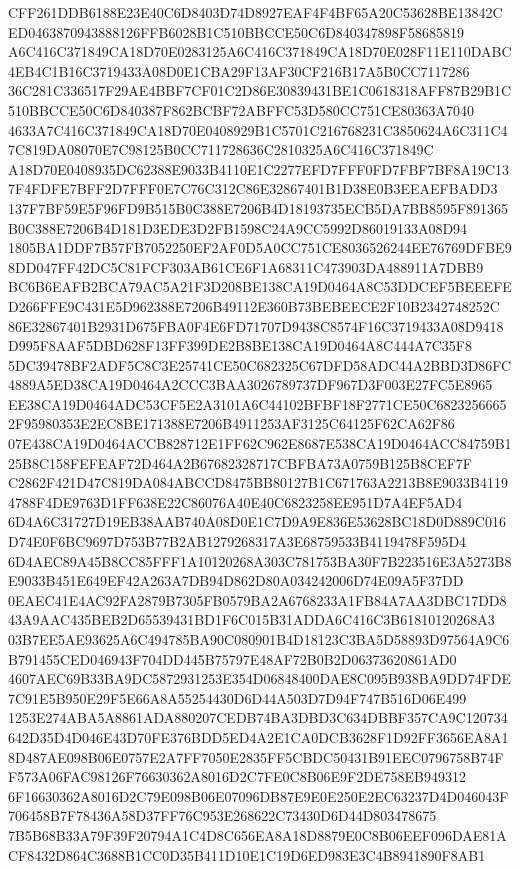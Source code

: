 \documentclass[UTF8,fontset=fandol,zihao=-4,a4paper]{ctexart}
\begin{document}
{{CFF261DDB6188E23E40C6D8403D74D8927EAF4F4BF65A20C53628BE13842CED0463870943888126FFB6028B1C510BBCCE50C6D840347898F58685819
A6C416C371849CA18D70E0283125A6C416C371849CA18D70E028F11E110DABC4EB4C1B16C3719433A08D0E1CBA29F13AF30CF216B17A5B0CC7117286
36C281C336517F29AE4BBF7CF01C2D86E30839431BE1C0618318AFF87B29B1C510BBCCE50C6D840387F862BCBF72ABFFC53D580CC751CE80363A7040
4633A7C416C371849CA18D70E0408929B1C5701C216768231C3850624A6C311C47C819DA08070E7C98125B0CC711728636C2810325A6C416C371849C
A18D70E0408935DC62388E9033B4110E1C2277EFD7FFF0FD7FBF7BF8A19C137F4FDFE7BFF2D7FFF0E7C76C312C86E32867401B1D38E0B3EEAEFBADD3
137F7BF59E5F96FD9B515B0C388E7206B4D18193735ECB5DA7BB8595F891365B0C388E7206B4D181D3EDE3D2FB1598C24A9CC5992D86019133A08D94
1805BA1DDF7B57FB7052250EF2AF0D5A0CC751CE8036526244EE76769DFBE98DD047FF42DC5C81FCF303AB61CE6F1A68311C473903DA488911A7DBB9
BC6B6EAFB2BCA79AC5A21F3D208BE138CA19D0464A8C53DDCEF5BEEEFED266FFE9C431E5D962388E7206B49112E360B73BEBEECE2F10B2342748252C
86E32867401B2931D675FBA0F4E6FD71707D9438C8574F16C3719433A08D9418D995F8AAF5DBD628F13FF399DE2B8BE138CA19D0464A8C444A7C35F8
5DC39478BF2ADF5C8C3E25741CE50C682325C67DFD58ADC44A2BBD3D86FC4889A5ED38CA19D0464A2CCC3BAA3026789737DF967D3F003E27FC5E8965
EE38CA19D0464ADC53CF5E2A3101A6C44102BFBF18F2771CE50C68232566652F95980353E2EC8BE171388E7206B4911253AF3125C64125F62CA62F86
07E438CA19D0464ACCB828712E1FF62C962E8687E538CA19D0464ACC84759B125B8C158FEFEAF72D464A2B67682328717CBFBA73A0759B125B8CEF7F
C2862F421D47C819DA084ABCCD8475BB80127B1C671763A2213B8E9033B41194788F4DE9763D1FF638E22C86076A40E40C6823258EE951D7A4EF5AD4
6D4A6C31727D19EB38AAB740A08D0E1C7D9A9E836E53628BC18D0D889C016D74E0F6BC9697D753B77B2AB1279268317A3E68759533B4119478F595D4
6D4AEC89A45B8CC85FFF1A10120268A303C781753BA30F7B223516E3A5273B8E9033B451E649EF42A263A7DB94D862D80A034242006D74E09A5F37DD
0EAEC41E4AC92FA2879B7305FB0579BA2A6768233A1FB84A7AA3DBC17DD843A9AAC435BEB2D65539431BD1F6C015B31ADDA6C416C3B61810120268A3
03B7EE5AE93625A6C494785BA90C080901B4D18123C3BA5D58893D97564A9C6B791455CED046943F704DD445B75797E48AF72B0B2D06373620861AD0
4607AEC69B33BA9DC5872931253E354D06848400DAE8C095B938BA9DD74FDE7C91E5B950E29F5E66A8A55254430D6D44A503D7D94F747B516D06E499
1253E274ABA5A8861ADA880207CEDB74BA3DBD3C634DBBF357CA9C120734642D35D4D046E43D70FE376BDD5ED4A2E1CA0DCB3628F1D92FF3656EA8A1
8D487AE098B06E0757E2A7FF7050E2835FF5CBDC50431B91EEC0796758B74FF573A06FAC98126F76630362A8016D2C7FE0C8B06E9F2DE758EB949312
6F16630362A8016D2C79E098B06E07096DB87E9E0E250E2EC63237D4D046043F706458B7F78436A58D37FF76C953E268622C73430D6D44D803478675
7B5B68B33A79F39F20794A1C4D8C656EA8A18D8879E0C8B06EEF096DAE81ACF8432D864C3688B1CC0D35B411D10E1C19D6ED983E3C4B8941890F8AB1
}}
\end{document}
